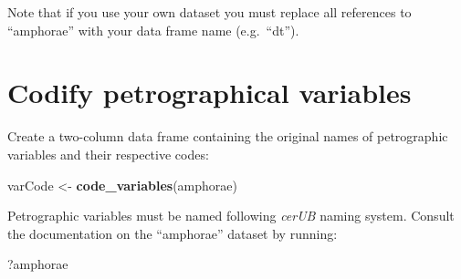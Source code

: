 \documentclass[12pt,]{book}
\newenvironment{Shaded}{\begin{snugshade}}{\end{snugshade}}
\newcommand{\CommentTok}[1]{\textcolor[rgb]{0.56,0.35,0.01}{\textit{#1}}}
\newcommand{\DataTypeTok}[1]{\textcolor[rgb]{0.13,0.29,0.53}{#1}}
\newcommand{\DecValTok}[1]{\textcolor[rgb]{0.00,0.00,0.81}{#1}}
\newcommand{\KeywordTok}[1]{\textcolor[rgb]{0.13,0.29,0.53}{\textbf{#1}}}
\newcommand{\NormalTok}[1]{#1}
\newcommand{\OperatorTok}[1]{\textcolor[rgb]{0.81,0.36,0.00}{\textbf{#1}}}
\newcommand{\StringTok}[1]{\textcolor[rgb]{0.31,0.60,0.02}{#1}}
\begin{document}
\begin{Shaded}
\end{Shaded}

Note that if you use your own dataset you must replace all references to ``amphorae'' with your data frame name (e.g.~``dt'').

\hypertarget{codify-petrographical-variables}{%
\section{Codify petrographical variables}\label{codify-petrographical-variables}}

Create a two-column data frame containing the original names of petrographic variables and their respective codes:

\begin{Shaded}
\begin{Highlighting}[]
\NormalTok{varCode <-}\StringTok{ }\KeywordTok{code_variables}\NormalTok{(amphorae)}
\end{Highlighting}
\end{Shaded}

Petrographic variables must be named following \emph{cerUB} naming system. Consult the documentation on the ``amphorae'' dataset by running:

\begin{Shaded}
\begin{Highlighting}[]
\NormalTok{?amphorae}
\end{Highlighting}
\end{Shaded}
\end{document}
